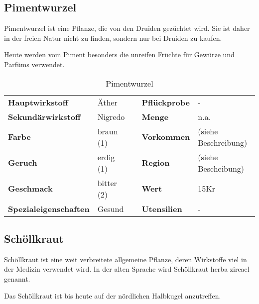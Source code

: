 \subsection{Pimentwurzel}
Pimentwurzel ist eine Pflanze, die von den Druiden gezüchtet wird. Sie ist daher in der freien Natur nicht zu finden, sondern nur bei Druiden zu kaufen.

Heute werden vom Piment besonders die unreifen Früchte für Gewürze und Parfüms verwendet.

\begin{table}[h] 
\begin{center} 
\begin{tabular}{|l|l|p{1cm}|l|l|} 
  	\cline{1-2} \cline{4-5} 
  	\textbf{Hauptwirkstoff} & Äther && \textbf{Pflückprobe} & - \\ \cline{1-2} \cline{4-5} 
  	\textbf{Sekundärwirkstoff} & Nigredo && \textbf{Menge} & n.a. \\ \cline{1-2} \cline{4-5} 
  	\textbf{Farbe} & braun (1) && \textbf{Vorkommen} & (siehe Beschreibung) \\ \cline{1-2} \cline{4-5} 
  	\textbf{Geruch} & erdig (1) && \textbf{Region} & (siehe Bescheibung) \\ \cline{1-2} \cline{4-5} 
  	\textbf{Geschmack} & bitter (2) && \textbf{Wert} & 15Kr \\ \cline{1-2} \cline{4-5} 
  	\textbf{Spezialeigenschaften} & Gesund && \textbf{Utensilien} & - \\ \cline{1-2} \cline{4-5} 
\end{tabular} 
\end{center} 
\caption{Pimentwurzel} 
\label{tab:pimentwurzel} 
\end{table}


\subsection{Schöllkraut}
Schöllkraut ist eine weit verbreitete allgemeine Pflanze, deren Wirkstoffe viel in der Medizin verwendet wird. In der alten Sprache wird Schöllkraut herba zireael genannt.

Das Schöllkraut ist bis heute auf der nördlichen Halbkugel anzutreffen. 

